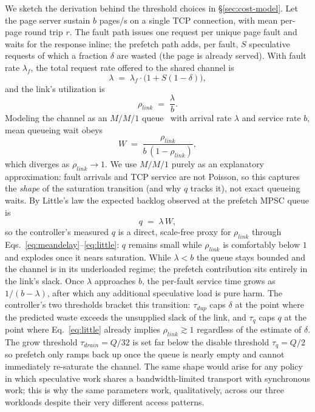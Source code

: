 \documentclass[journal]{IEEEtran}
\newcommand{\dupthr}{\ensuremath{\tau_\textit{dup}}}
\newcommand{\qthr}{\ensuremath{\tau_q}}
\newcommand{\drainthr}{\ensuremath{\tau_\textit{drain}}}
\begin{document}
We sketch the derivation behind the threshold choices in
\S\ref{sec:cost-model}. Let the page server sustain $b$ pages/s on a single
TCP connection, with mean per-page round trip $r$. The fault path issues
one request per unique page fault and waits for the response inline; the
prefetch path adds, per fault, $S$ speculative requests of which a fraction
$\delta$ are wasted (the page is already served). With fault rate
$\lambda_f$, the total request rate offered to the shared channel is
\begin{equation}
  \lambda \;=\; \lambda_f \cdot \bigl(1 + S(1-\delta)\bigr),
  \label{eq:offered}
\end{equation}
and the link's utilization is
\begin{equation}
  \rho_{\!\textit{link}} \;=\; \frac{\lambda}{b}.
  \label{eq:rho-link}
\end{equation}
Modeling the channel as an $M\!/\!M\!/1$ queue~\cite{kleinrock1975queueing}
with arrival rate $\lambda$ and service rate $b$, mean queueing wait obeys
\begin{equation}
  W \;=\; \frac{\rho_{\!\textit{link}}}{b\,(1-\rho_{\!\textit{link}})},
  \label{eq:meandelay}
\end{equation}
which diverges as $\rho_{\!\textit{link}}\!\to\!1$. We use $M\!/\!M\!/1$ purely
as an explanatory approximation: fault arrivals and TCP service are not
Poisson, so this captures the \emph{shape} of the saturation transition (and
why $q$ tracks it), not exact queueing waits. By Little's law the
expected backlog observed at the prefetch MPSC queue is
\begin{equation}
  q \;=\; \lambda \, W,
  \label{eq:little}
\end{equation}
so the controller's measured $q$ is a direct, scale-free proxy for
$\rho_{\!\textit{link}}$ through Eqs.~\eqref{eq:meandelay}--\eqref{eq:little}:
$q$ remains small while $\rho_{\!\textit{link}}$ is comfortably below $1$
and explodes once it nears saturation. While $\lambda < b$ the queue stays
bounded and the channel is in its underloaded regime; the prefetch
contribution sits entirely in the link's slack. Once $\lambda$ approaches
$b$, the per-fault service time grows as $1/(b-\lambda)$, after which any
additional speculative load is pure harm. The controller's two thresholds
bracket this transition: $\dupthr$ caps $\delta$ at the point where the
predicted waste exceeds the unsupplied slack of the link, and $\qthr$ caps
$q$ at the point where Eq.~\eqref{eq:little} already implies
$\rho_{\!\textit{link}}\!\gtrsim\!1$ regardless of the estimate of $\delta$.
The grow threshold $\drainthr\!=\!Q/32$ is set far below the disable
threshold $\qthr\!=\!Q/2$ so prefetch only ramps back up once the queue is
nearly empty and cannot immediately re-saturate the channel. The same shape would arise for any policy in which
speculative work shares a bandwidth-limited transport with synchronous
work; this is why the same parameters work, qualitatively, across our
three workloads despite their very different access patterns.
\end{document}
